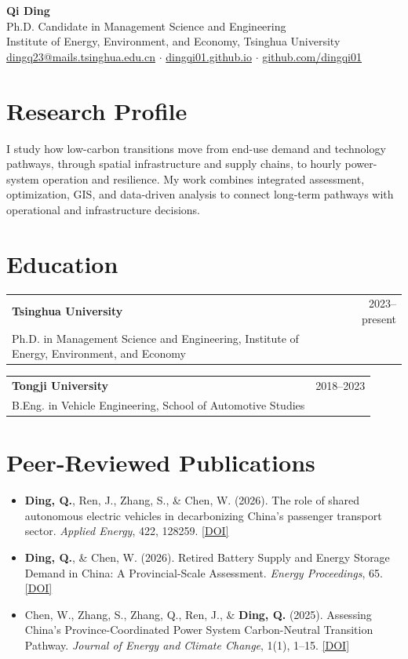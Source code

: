 \documentclass[10pt,a4paper]{article}
\makeatletter
\newcommand{\entry}[3]{%
  \begin{tabularx}{\linewidth}{@{}Xr@{}}
    \textbf{#1} & \textcolor{secondary}{#3} \\
    #2 &
  \end{tabularx}\vspace{0.04em}}
\makeatother
\begin{document}
\begin{center}
  {\LARGE\bfseries Qi Ding}\\[0.16em]
  Ph.D. Candidate in Management Science and Engineering\\
  Institute of Energy, Environment, and Economy, Tsinghua University\\[0.2em]
  \href{mailto:dingq23@mails.tsinghua.edu.cn}{dingq23@mails.tsinghua.edu.cn}
  \enspace$\cdot$\enspace
  \href{https://dingqi01.github.io/}{dingqi01.github.io}
  \enspace$\cdot$\enspace
  \href{https://github.com/dingqi01}{github.com/dingqi01}
\end{center}

\section{Research Profile}
I study how low-carbon transitions move from end-use demand and technology pathways, through spatial infrastructure and supply chains, to hourly power-system operation and resilience. My work combines integrated assessment, optimization, GIS, and data-driven analysis to connect long-term pathways with operational and infrastructure decisions.

\section{Education}
\entry{Tsinghua University}{Ph.D. in Management Science and Engineering, Institute of Energy, Environment, and Economy}{2023--present}
\entry{Tongji University}{B.Eng. in Vehicle Engineering, School of Automotive Studies}{2018--2023}

\section{Peer-Reviewed Publications}
\begin{itemize}
  \item \textbf{Ding, Q.}, Ren, J., Zhang, S., \& Chen, W. (2026). The role of shared autonomous electric vehicles in decarbonizing China's passenger transport sector. \textit{Applied Energy}, 422, 128259. \href{https://doi.org/10.1016/j.apenergy.2026.128259}{[DOI]}
  \item \textbf{Ding, Q.}, \& Chen, W. (2026). Retired Battery Supply and Energy Storage Demand in China: A Provincial-Scale Assessment. \textit{Energy Proceedings}, 65. \href{https://doi.org/10.46855/energy-proceedings-12238}{[DOI]}
  \item Chen, W., Zhang, S., Zhang, Q., Ren, J., \& \textbf{Ding, Q.} (2025). Assessing China's Province-Coordinated Power System Carbon-Neutral Transition Pathway. \textit{Journal of Energy and Climate Change}, 1(1), 1--15. \href{https://doi.org/10.3724/j.issn.2097-4981.JECC-2024-0022}{[DOI]}
\end{itemize}
\end{document}
